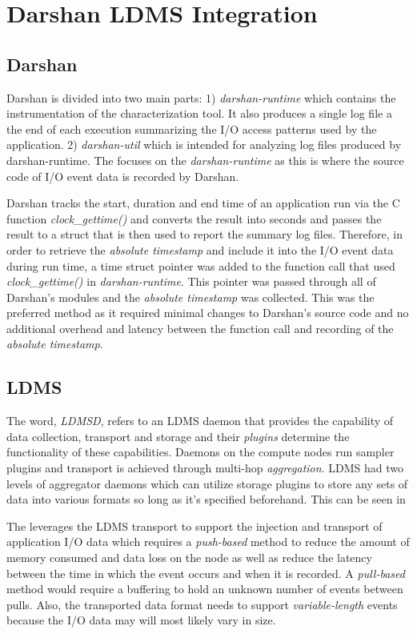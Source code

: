\documentclass[conference]{IEEEtran}
\begin{document}
\section{Darshan LDMS Integration}
\subsection{Darshan}
Darshan is divided into two main parts: 1) \emph{darshan-runtime} which contains the instrumentation of the characterization tool. It also produces a single log file a the end of each execution summarizing the I/O access patterns used by the application. 2) \emph{darshan-util} which is intended for analyzing log files produced by darshan-runtime. The \Darshan focuses on the \emph{darshan-runtime} as this is where the source code of I/O event data is recorded by Darshan.

Darshan tracks the start, duration and end time of an application run via the C function \emph{clock\_gettime()} and converts the result into seconds and passes the result to a struct that is then used to report the summary log files. Therefore, in order to retrieve the \emph{absolute timestamp} and include it into the I/O event data during run time, a time struct pointer was added to the function call that used \emph{clock\_gettime()} in \emph{darshan-runtime}. This pointer was passed through all of Darshan's modules and the \emph{absolute timestamp} was collected. This was the preferred method as it required minimal changes to Darshan's source code and no additional overhead and latency between the function call and recording of the \emph{absolute timestamp}.  

\subsection{LDMS}
The word, \emph{LDMSD}, refers to an LDMS daemon that provides the capability of data collection, transport and storage and their \emph{plugins} determine the functionality of these capabilities. Daemons on the compute nodes run sampler plugins and transport is achieved through multi-hop \emph{aggregation}. LDMS had two levels of aggregator daemons  which can utilize storage plugins to store any sets of data into various formats so long as it's specified beforehand. This can be seen in 

The \Darshan leverages the LDMS transport to support the injection and transport of application I/O data which requires a \emph{push-based} method to reduce the amount of memory consumed and data loss on the node as well as reduce the latency between the time in which the event occurs and when it is recorded. A \emph{pull-based} method would require a buffering to hold an unknown number of events between pulls. Also, the transported data format needs to support  \emph{variable-length} events because the I/O data may will most likely vary in size. 
\end{document}
